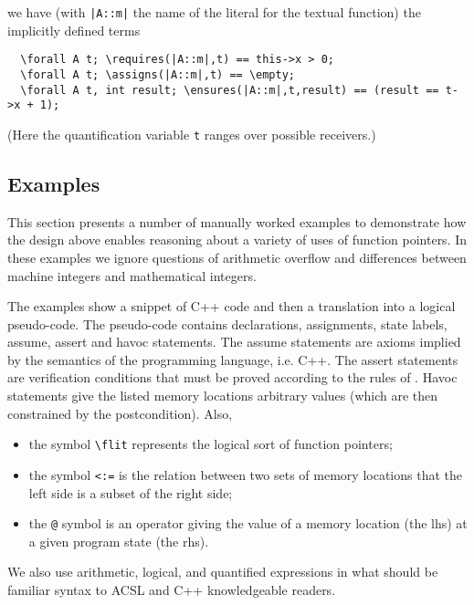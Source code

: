 

we have (with \lstinline+|A::m|+ the name of the literal for the textual
function) the implicitly defined terms

\begin{lstlisting}
  \forall A t; \requires(|A::m|,t) == this->x > 0;
  \forall A t; \assigns(|A::m|,t) == \empty;
  \forall A t, int result; \ensures(|A::m|,t,result) == (result == t->x + 1);
\end{lstlisting}
(Here the quantification variable \lstinline|t| ranges over possible receivers.)

\subsection{Examples}
\label{sec:fpexamples}

This section presents a number of manually worked examples 
to demonstrate how the design above enables reasoning about
a variety of uses of function pointers.
In these examples we ignore questions of arithmetic overflow and 
differences between machine integers and mathematical integers.

The examples show a snippet of C++ code and then a translation into a logical
pseudo-code. The pseudo-code contains declarations, assignments, state labels, assume, assert and havoc statements. 
The assume statements are axioms implied by the semantics of the
programming language, i.e. C++. 
The assert statements are verification conditions that
must be proved according to the rules of \NAME.
Havoc statements give the listed memory locations arbitrary values (which are then constrained by the postcondition). Also,
\begin{itemize}[noitemsep,nolistsep]
	\item the symbol \lstinline|\flit| represents the logical sort of function pointers;
	\item the symbol \lstinline|<:=| is the relation between two sets of memory locations that the left side is a subset of the right side;
	\item the \lstinline|@| symbol is an operator giving the value of a memory location (the lhs) at a given program state (the rhs).
\end{itemize}

We also use arithmetic, logical, and quantified expressions in what should be familiar syntax to ACSL and C++ knowledgeable readers.


